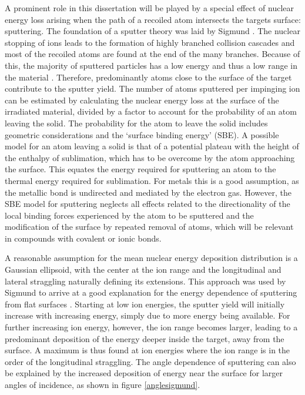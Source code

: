 A prominent role in this dissertation will be played by a special effect of nuclear energy loss arising when the path of a recoiled atom intersects the targets surface: sputtering. The foundation of a sputter theory was laid by Sigmund \cite{sigmund_theory_1969}. The nuclear stopping of ions leads to the formation of highly branched collision cascades and most of the recoiled atoms are found at the end of the many branches. Because of this, the majority of sputtered particles has a low energy and thus a low range in the material \cite{thompson_energy_1968}. Therefore, predominantly atoms close to the surface of the target contribute to the sputter yield. The number of atoms sputtered per impinging ion can be estimated by calculating the nuclear energy loss at the surface of the irradiated material, divided by a factor to account for the probability of an atom leaving the solid. The probability for the atom to leave the solid includes geometric considerations and the `surface binding energy' (SBE). A possible model for an atom leaving a solid is that of a potential plateau with the height of the enthalpy of sublimation, which has to be overcome by the atom approaching the surface. This equates the energy required for sputtering an atom to the thermal energy required for sublimation. For metals this is a good assumption, as the metallic bond is undirected and mediated by the electron gas. However, the SBE model for sputtering neglects all effects related to the directionality of the local binding forces experienced by the atom to be sputtered and the modification of the surface by repeated removal of atoms, which will be relevant in compounds with covalent or ionic bonds.  

A reasonable assumption for the mean nuclear energy deposition distribution is a Gaussian ellipsoid, with the center at the ion range and the longitudinal and lateral straggling naturally defining its extensions. This approach was used by Sigmund to arrive at a good explanation for the energy dependence of sputtering from flat surfaces \cite{sigmund_theory_1969}. Starting at low ion energies, the sputter yield will initially increase with increasing energy, simply due to more energy being available. For further increasing ion energy, however, the ion range becomes larger, leading to a predominant deposition of the energy deeper inside the target, away from the surface. A maximum is thus found at ion energies where the ion range is in the order of the longitudinal straggling. The angle dependence of sputtering can also be explained by the increased deposition of energy near the surface for larger angles of incidence, as shown in figure \ref{anglesigmund}.

